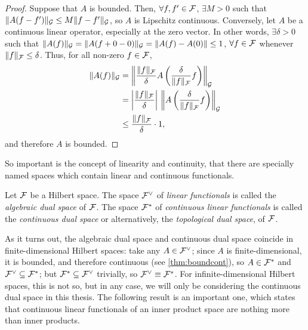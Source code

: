 \begin{proof}
  Suppose that $A$ is bounded.
  Then, $\forall f,f' \in {\mathcal F}$, $\exists M>0$ such that $\lVert A(f-f')\rVert_{\mathcal G} \leq M \lVert f-f'\rVert_{\mathcal G}$, so $A$ is Lipschitz continuous.
  Conversely, let $A$ be a continuous linear operator, especially at the zero vector.
  In other words, $\exists \delta > 0$ such that $\lVert A(f)\rVert_{\mathcal G} = \lVert A(f+0-0)\rVert_{\mathcal G} = \lVert A(f) - A(0)\rVert \leq 1$, $\forall f\in{\mathcal F}$ whenever $\lVert f\rVert_{\mathcal F} \leq \delta$.
  Thus, for all non-zero $f \in{\mathcal F}$,
  \begin{align*}
    \norm{A(f)}_\cG &= \left\Vert \frac{\norm{f}_\cF}{\delta} A\left(\frac{\delta}{\norm{f}_\cF}f\right)\right\Vert_\cG \\
    &= \left\vert \frac{\norm{f}_\cF}{\delta}\right\vert \, \left\Vert A\left(\frac{\delta}{\norm{f}_\cF}f\right)\right\Vert_\cG \\    
    &\leq \frac{\norm{f}_\cF}{\delta} \cdot 1, \vspace{-0.5em}
  \end{align*}
  and therefore $A$ is bounded.
\end{proof}
\vspace{-0.5em}
So important is the concept of linearity and continuity, that there are specially named spaces which contain linear and continuous functionals.

\begin{definition}
  Let ${\mathcal F}$ be a Hilbert space. 
  The space ${\mathcal F}^\vee$ of \emph{linear functionals} is called the \emph{algebraic dual space} of ${\mathcal F}$.
  The space ${\mathcal F}^*$ of \emph{continuous linear functionals} is called the \emph{continuous dual space} or alternatively, the \emph{topological dual space}, of ${\mathcal F}$.   
\end{definition}

As it turns out, the algebraic dual space and continuous dual space coincide in finite-dimensional Hilbert spaces:
take any $A\in{\mathcal F}^\vee$; since $A$ is finite-dimensional, it is bounded, and therefore continuous (see \cref{thm:boundcont}), so $A\in{\mathcal F}^*$ and ${\mathcal F}^\vee \subseteq {\mathcal F}^*$; but ${\mathcal F}^* \subseteq {\mathcal F}^\vee$ trivially, so ${\mathcal F}^\vee \equiv {\mathcal F}^*$.
For infinite-dimensional Hilbert spaces, this is not so, but in any case, we will only be considering the continuous dual space in this thesis.
The following result is an important one, which states that continuous linear functionals of an inner product space are nothing more than inner products.


